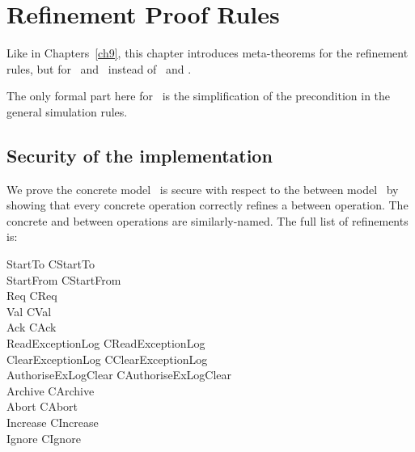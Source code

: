 \chapter[\Betw\ to \Conc\  rules]{Refinement Proof Rules}\label{ch25}

Like in Chapters~\ref{ch9}, this chapter introduces meta-theorems
for the refinement rules, but for \Betw\ and \Conc\ instead of \Abs\
and \Betw.

The only formal part here for \zeves\ is the simplification of the
precondition in the general simulation rules.

\section{Security of the implementation}

We prove the concrete model \Conc\ is secure with respect to the
between model \Betw\ by showing that every concrete operation
correctly refines a between operation.  The concrete and between
operations are similarly-named.  The full list of refinements is:
\begin{gzed}
  StartTo
  \sqsubseteq CStartTo
  \\ %
  StartFrom
  \sqsubseteq CStartFrom
  \\ %
  Req
  \sqsubseteq CReq
  \\ %
  Val
  \sqsubseteq CVal
  \\ %
  Ack
  \sqsubseteq CAck
  \\ %
  ReadExceptionLog
  \sqsubseteq CReadExceptionLog
  \\ %
  ClearExceptionLog
  \sqsubseteq CClearExceptionLog
  \\ %
  AuthoriseExLogClear
  \sqsubseteq CAuthoriseExLogClear
  \\ %
  Archive
  \sqsubseteq CArchive
  \\ %
  Abort
  \sqsubseteq CAbort
  \\ %
  Increase
  \sqsubseteq CIncrease
  \\ %
  Ignore
  \sqsubseteq CIgnore
\end{gzed}

